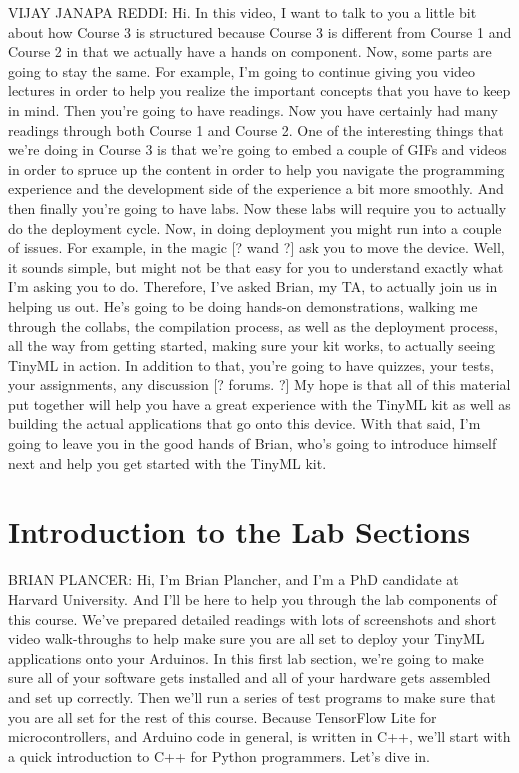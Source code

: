 VIJAY JANAPA REDDI: Hi.
In this video, I want to talk to you a little bit about how
Course 3 is structured because Course 3 is different from Course 1
and Course 2 in that we actually have a hands on component.
Now, some parts are going to stay the same.
For example, I'm going to continue giving you
video lectures in order to help you realize the important concepts that you
have to keep in mind.
Then you're going to have readings.
Now you have certainly had many readings through both Course 1 and Course 2.
One of the interesting things that we're doing in Course 3
is that we're going to embed a couple of GIFs and videos
in order to spruce up the content in order
to help you navigate the programming experience and the development
side of the experience a bit more smoothly.
And then finally you're going to have labs.
Now these labs will require you to actually do the deployment cycle.
Now, in doing deployment you might run into a couple of issues.
For example, in the magic [? wand ?] ask you to move the device.
Well, it sounds simple, but might not be that easy
for you to understand exactly what I'm asking you to do.
Therefore, I've asked Brian, my TA, to actually join us in helping us out.
He's going to be doing hands-on demonstrations,
walking me through the collabs, the compilation process, as well
as the deployment process, all the way from getting started,
making sure your kit works, to actually seeing TinyML in action.
In addition to that, you're going to have quizzes, your tests,
your assignments, any discussion [? forums. ?]
My hope is that all of this material put together
will help you have a great experience with the TinyML kit
as well as building the actual applications that go onto this device.
With that said, I'm going to leave you in the good hands of Brian, who's
going to introduce himself next and help you get started with the TinyML kit.


\section{Introduction to the Lab Sections}

BRIAN PLANCER: Hi, I'm Brian Plancher, and I'm
a PhD candidate at Harvard University.
And I'll be here to help you through the lab components of this course.
We've prepared detailed readings with lots of screenshots and short video
walk-throughs to help make sure you are all set to deploy your TinyML
applications onto your Arduinos.
In this first lab section, we're going to make sure all of your software
gets installed and all of your hardware gets assembled and set up correctly.
Then we'll run a series of test programs to make sure that you are all
set for the rest of this course.
Because TensorFlow Lite for microcontrollers,
and Arduino code in general, is written in C++,
we'll start with a quick introduction to C++ for Python programmers.
Let's dive in.

